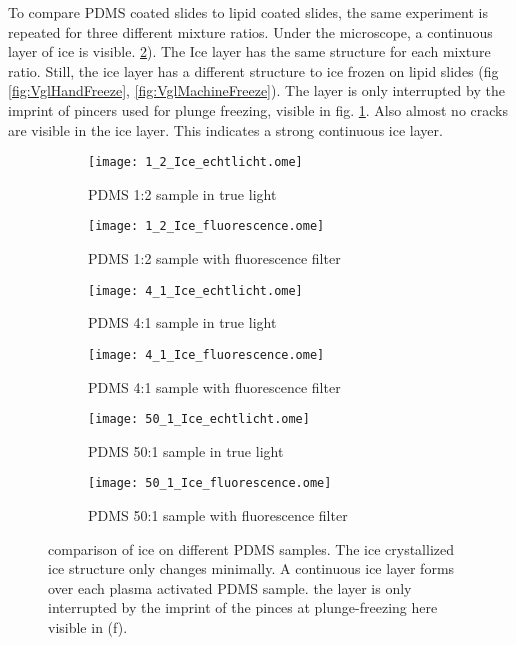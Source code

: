 To compare PDMS coated slides to lipid coated slides, the same experiment is repeated for three different mixture ratios. Under the microscope, a continuous layer of ice is visible. \ref{fig:VglPDMSicemixtureratio}). The Ice layer has the same structure for each mixture ratio. Still, the ice layer has a different structure to ice frozen on lipid slides (fig \ref{fig:VglHandFreeze}, \ref{fig:VglMachineFreeze}). The layer is only interrupted by the imprint of pincers used for plunge freezing, visible in fig. \ref{fig:VglPDMSicemixtureratio_f}. Also almost no cracks are visible in the ice layer. This indicates a strong continuous ice layer.

\begin{figure}[hbt!]
	\centering
	\begin{subfigure}[]{0.45\textwidth}
		\centering
		\texttt{[image: 1\_2\_Ice\_echtlicht.ome]}
		\caption{PDMS 1:2 sample in true light}
	\end{subfigure}
	\begin{subfigure}[]{0.45\textwidth}
		\centering
		\texttt{[image: 1\_2\_Ice\_fluorescence.ome]}
		\caption{PDMS 1:2 sample with fluorescence filter}
	\end{subfigure}
	\begin{subfigure}[]{0.45\textwidth}
		\centering
		\texttt{[image: 4\_1\_Ice\_echtlicht.ome]}
		\caption{PDMS 4:1 sample in true light}
	\end{subfigure}
	\begin{subfigure}[]{0.45\textwidth}
		\centering
		\texttt{[image: 4\_1\_Ice\_fluorescence.ome]}
		\caption{PDMS 4:1 sample with fluorescence filter}
	\end{subfigure}
	\begin{subfigure}[]{0.45\textwidth}
		\centering
		\texttt{[image: 50\_1\_Ice\_echtlicht.ome]}
		\caption{PDMS 50:1 sample in true light}
	\end{subfigure}
		\begin{subfigure}[]{0.45\textwidth}
		\centering
		\texttt{[image: 50\_1\_Ice\_fluorescence.ome]}
		\caption{PDMS 50:1 sample with fluorescence filter}
		\label{fig:VglPDMSicemixtureratio_f}
	\end{subfigure}
	\caption{comparison of ice on different PDMS samples. The ice crystallized ice structure only changes minimally. A continuous ice layer forms over each plasma activated PDMS sample. the layer is only interrupted by the imprint of the pinces at plunge-freezing here visible in (f).}
	\label{fig:VglPDMSicemixtureratio}
\end{figure}

